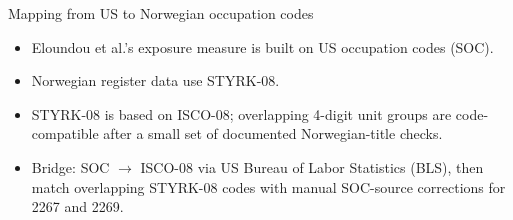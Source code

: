 
\begin{frame}{Mapping from US to Norwegian occupation codes}
\begin{itemize}\setlength{\itemsep}{8pt}
  \item Eloundou et al.'s exposure measure is built on US occupation codes (SOC).
  \item Norwegian register data use STYRK-08.
  \item STYRK-08 is based on ISCO-08; overlapping 4-digit unit groups are code-compatible after a small set of documented Norwegian-title checks.
  \item Bridge: SOC $\to$ ISCO-08 via US Bureau of Labor Statistics (BLS), then match overlapping STYRK-08 codes with manual SOC-source corrections for 2267 and 2269.
\end{itemize}
\end{frame}





